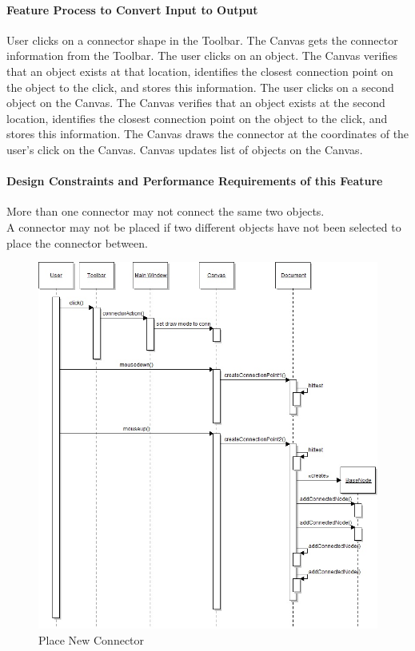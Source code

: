 \documentclass[twoside,letterpaper]{article}
\begin{document}
{\paragraph{Feature Process to Convert Input to Output}
{
User clicks on a connector shape in the Toolbar.  
The Canvas gets the connector information from the Toolbar.  
The user clicks on an object.
The Canvas verifies that an object exists at that location, identifies the closest connection point on the object to the click, and stores this information.
The user clicks on a second object on the Canvas.  
The Canvas verifies that an object exists at the second location, identifies the closest connection point on the object to the click, and stores this information.  
The Canvas draws the connector at the coordinates of the user{\textquoteright}s click on the Canvas.  
Canvas updates list of objects on the Canvas.  
}

\paragraph{Design Constraints and Performance Requirements of this Feature}
{
More than one connector may not connect the same two objects.
\\A connector may not be placed if two different objects have not been selected to place the connector between.
}
\bigskip
\bigskip

\begin{figure}[h]
\centering
\includegraphics[width=5.0in]{IntNewConn.jpg}
\caption{Place New Connector}
\end{figure}

}
\end{document}
